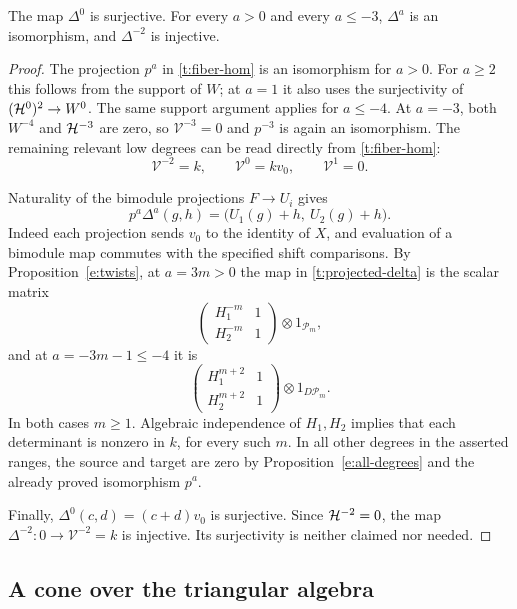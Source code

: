 \begin{lemma}\label{t:comparison-maps}
The map $\Delta^0$ is surjective.  For every $a>0$ and every
$a\leq-3$, $\Delta^a$ is an isomorphism, and $\Delta^{-2}$ is
injective.
\end{lemma}

\begin{proof}
The projection $p^a$ in \eqref{t:fiber-hom} is an isomorphism for
$a>0$.  For $a\geq2$ this follows from the support of $W$; at $a=1$
it also uses the surjectivity of $(\mathcal H^0)^2\to W^0$.
The same support argument applies for $a\leq-4$.
At $a=-3$, both $W^{-4}$ and $\mathcal H^{-3}$ are zero, so
$\mathcal V^{-3}=0$ and $p^{-3}$ is again an isomorphism.
The remaining relevant low degrees can be read directly from
\eqref{t:fiber-hom}:
\begin{equation}\label{t:boundary-fiber}
 \mathcal V^{-2}=k,
 \qquad \mathcal V^0=kv_0,
 \qquad \mathcal V^1=0.
\end{equation}

Naturality of the bimodule projections $F\to U_i$ gives
\begin{equation}\label{t:projected-delta}
 p^a\Delta^a(g,h)=
 \bigl(U_1(g)+h,\ U_2(g)+h\bigr).
\end{equation}
Indeed each projection sends $v_0$ to the identity of $X$, and
evaluation of a bimodule map commutes with the specified shift
comparisons.  By Proposition~\ref{e:twists}, at $a=3m>0$
the map in \eqref{t:projected-delta} is the scalar matrix
\[
 \begin{pmatrix}H_1^{-m}&1\\H_2^{-m}&1\end{pmatrix}
 \otimes 1_{\mathcal P_m},
\]
and at $a=-3m-1\leq-4$ it is
\[
 \begin{pmatrix}H_1^{m+2}&1\\H_2^{m+2}&1\end{pmatrix}
 \otimes 1_{D\mathcal P_m}.
\]
In both cases $m\geq1$.  Algebraic independence of $H_1,H_2$
implies that each determinant is nonzero in $k$, for every such $m$.
In all other degrees in the asserted ranges, the source and target
are zero by Proposition~\ref{e:all-degrees} and the already proved
isomorphism $p^a$.

Finally, $\Delta^0(c,d)=(c+d)v_0$ is surjective.  Since
$\mathcal H^{-2}=0$, the map $\Delta^{-2}:0\to\mathcal V^{-2}=k$ is
injective.  Its surjectivity is neither claimed nor needed.
\end{proof}

\subsection{A cone over the triangular algebra}

